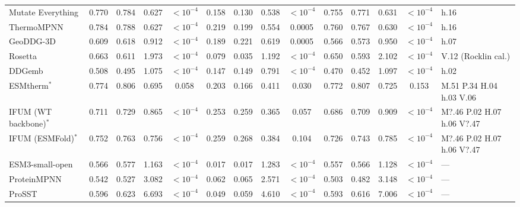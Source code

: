 \begin{table}[H]
{\begin{tabular}{lccccccccccccl}
Mutate Everything & 0.770 & 0.784 & 0.627 & $<10^{-4}$ & 0.158 & 0.130 & 0.538 & $<10^{-4}$ & 0.755 & 0.771 & 0.631 & $<10^{-4}$ & h.16 \\
ThermoMPNN & 0.784 & 0.788 & 0.627 & $<10^{-4}$ & 0.219 & 0.199 & 0.554 & 0.0005 & 0.760 & 0.767 & 0.630 & $<10^{-4}$ & h.16 \\
GeoDDG-3D & 0.609 & 0.618 & 0.912 & $<10^{-4}$ & 0.189 & 0.221 & 0.619 & 0.0005 & 0.566 & 0.573 & 0.950 & $<10^{-4}$ & h.07 \\
Rosetta & 0.663 & 0.611 & 1.973 & $<10^{-4}$ & 0.079 & 0.035 & 1.192 & $<10^{-4}$ & 0.650 & 0.593 & 2.102 & $<10^{-4}$ & V.12 (Rocklin cal.) \\
DDGemb & 0.508 & 0.495 & 1.075 & $<10^{-4}$ & 0.147 & 0.149 & 0.791 & $<10^{-4}$ & 0.470 & 0.452 & 1.097 & $<10^{-4}$ & h.02 \\
ESMtherm$^*$ & 0.774 & 0.806 & 0.695 & 0.058 & 0.203 & 0.166 & 0.411 & 0.030 & 0.772 & 0.807 & 0.725 & 0.153 & M.51 P.34 H.04 h.03 V.06 \\
IFUM (WT backbone)$^*$ & 0.711 & 0.729 & 0.865 & $<10^{-4}$ & 0.253 & 0.259 & 0.365 & 0.057 & 0.686 & 0.709 & 0.909 & $<10^{-4}$ & M?.46 P.02 H.07 h.06 V?.47 \\
IFUM (ESMFold)$^*$ & 0.752 & 0.763 & 0.756 & $<10^{-4}$ & 0.259 & 0.268 & 0.384 & 0.104 & 0.726 & 0.743 & 0.785 & $<10^{-4}$ & M?.46 P.02 H.07 h.06 V?.47 \\
ESM3-small-open & 0.566 & 0.577 & 1.163 & $<10^{-4}$ & 0.017 & 0.017 & 1.283 & $<10^{-4}$ & 0.557 & 0.566 & 1.128 & $<10^{-4}$ & --- \\
ProteinMPNN & 0.542 & 0.527 & 3.082 & $<10^{-4}$ & 0.062 & 0.065 & 2.571 & $<10^{-4}$ & 0.503 & 0.482 & 3.148 & $<10^{-4}$ & --- \\
ProSST & 0.596 & 0.623 & 6.693 & $<10^{-4}$ & 0.049 & 0.059 & 4.610 & $<10^{-4}$ & 0.593 & 0.616 & 7.006 & $<10^{-4}$ & --- \\
\bottomrule
\end{tabular}
}
\end{table}
